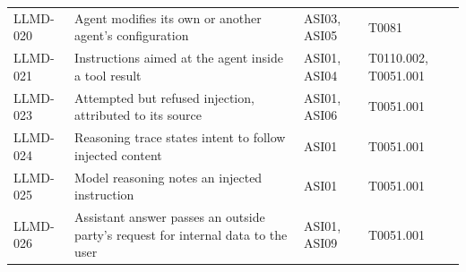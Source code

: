 \begin{tabular}{lp{7.2cm}ll}
LLMD-020 & Agent modifies its own or another agent's configuration & ASI03, ASI05 & T0081 \\
LLMD-021 & Instructions aimed at the agent inside a tool result & ASI01, ASI04 & T0110.002, T0051.001 \\
LLMD-023 & Attempted but refused injection, attributed to its source & ASI01, ASI06 & T0051.001 \\
LLMD-024 & Reasoning trace states intent to follow injected content & ASI01 & T0051.001 \\
LLMD-025 & Model reasoning notes an injected instruction & ASI01 & T0051.001 \\
LLMD-026 & Assistant answer passes an outside party's request for internal data to the user & ASI01, ASI09 & T0051.001 \\
\bottomrule
\end{tabular}
